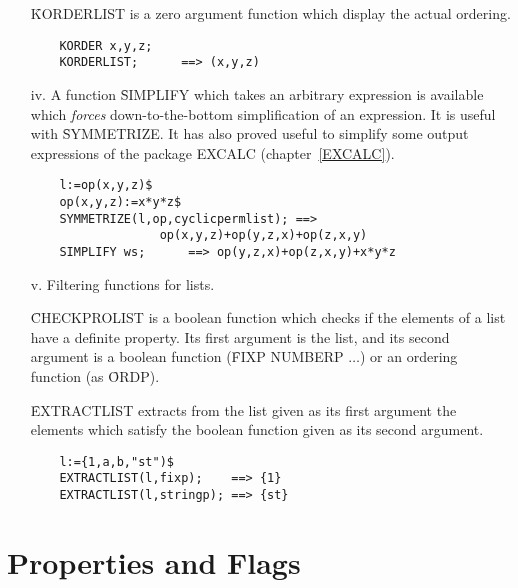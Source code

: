 \begin{itemize}
\f{KORDERLIST} is a zero argument function which
display the actual ordering.
\begin{verbatim}
	KORDER x,y,z;
	KORDERLIST;      ==> (x,y,z)
\end{verbatim}
\item[iv.] A function \f{SIMPLIFY} which takes an
arbitrary expression
is available which {\em forces} down-to-the-bottom simplification of
an expression.  It is useful with \f{SYMMETRIZE}.  It has also proved
useful to simplify some output expressions of the package EXCALC
(chapter~\ref{EXCALC}).
\begin{verbatim}
	l:=op(x,y,z)$
	op(x,y,z):=x*y*z$
	SYMMETRIZE(l,op,cyclicpermlist); ==>
			      op(x,y,z)+op(y,z,x)+op(z,x,y)
	SIMPLIFY ws;      ==> op(y,z,x)+op(z,x,y)+x*y*z
\end{verbatim}
\item[v.] Filtering functions for lists.

\f{CHECKPROLIST} is a boolean function which
checks if the elements of a list have a definite property.  Its first
argument is the list, and its second argument is a boolean function
(\f{FIXP NUMBERP $\ldots$}) or an ordering function (as \f{ORDP}).

\f{EXTRACTLIST} extracts from the list given as
its first argument the elements which satisfy the boolean function
given as its second argument.
\begin{verbatim}
	l:={1,a,b,"st")$
	EXTRACTLIST(l,fixp);    ==> {1}
	EXTRACTLIST(l,stringp); ==> {st}
\end{verbatim}
\end{itemize}

\section{Properties and Flags}


